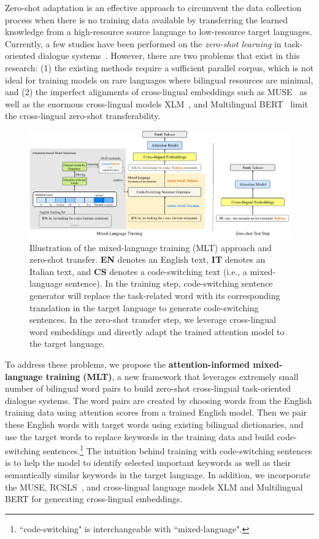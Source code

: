\documentclass[letterpaper]{article}
\begin{document}
Zero-shot adaptation is an effective approach to circumvent the data collection process when there is no training data available by transferring the learned knowledge from a high-resource source language to low-resource target languages. Currently, a few studies have been performed on the \textit{zero-shot learning} in task-oriented dialogue systems~\cite{chen2018xl,schuster2019cross}.
However, there are two problems that exist in this research:
(1) the existing methods require a sufficient parallel corpus, which is not ideal for training models on rare languages where bilingual resources are minimal, and (2) the imperfect alignments of cross-lingual embeddings such as MUSE~\cite{conneau2017word} as well as the enormous cross-lingual models XLM~\cite{lample2019cross}, and Multilingual BERT~\cite{devlin2019bert} limit the cross-lingual zero-shot transferability.


\begin{figure}[ht!]
    \centering
    \includegraphics[scale=0.82]{mixed_language_training.pdf}
    \caption{Illustration of the mixed-language training (MLT) approach and zero-shot transfer. \textbf{EN} denotes an English text, \textbf{IT} denotes an Italian text, and \textbf{CS} denotes a code-switching text (i.e., a mixed-language sentence). In the training step, code-switching sentence generator will replace the task-related word with its corresponding translation in the target language to generate code-switching sentences. In the zero-shot transfer step, we leverage cross-lingual word embeddings and directly adapt the trained attention model to the target language.}
    \label{fig:MLT}
\end{figure}

To address these problems, we propose the \textbf{attention-informed mixed-language training} \textbf{(MLT)}, a new framework that leverages extremely small number of bilingual word pairs to build zero-shot cross-lingual task-oriented dialogue systems. The word pairs are created by choosing words from the English training data using attention scores from a trained English model. Then we pair these English words with target words using existing bilingual dictionaries, and use the target words to replace keywords in the training data and build code-switching sentences.\footnote{``code-switching" is interchangeable with ``mixed-language".} The intuition behind training with code-switching sentences is to help the model to identify selected important keywords as well as their semantically similar keywords in the target language. In addition, we incorporate the MUSE, RCSLS~\cite{joulin2018loss}, and cross-lingual language models XLM and Multilingual BERT for generating cross-lingual embeddings.
\end{document}
